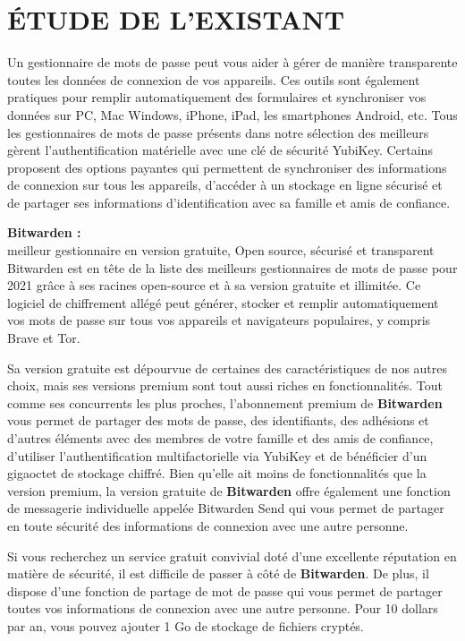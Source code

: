\documentclass[11pt,a4paper]{report}
\begin{document}
\chapter{ÉTUDE DE L'EXISTANT}

Un gestionnaire de mots de passe peut vous aider à gérer de manière transparente toutes les données de connexion de vos appareils. Ces outils sont également pratiques pour remplir automatiquement des formulaires et synchroniser vos données sur PC, Mac Windows, iPhone, iPad, les smartphones Android, etc. Tous les gestionnaires de mots de passe présents dans notre sélection des meilleurs gèrent l'authentification matérielle avec une clé de sécurité YubiKey. Certains proposent des options payantes qui permettent de synchroniser des informations de connexion sur tous les appareils, d'accéder à un stockage en ligne sécurisé et de partager ses informations d'identification avec sa famille et amis de confiance.

\textbf{Bitwarden :} \\
meilleur gestionnaire en version gratuite, Open source, sécurisé et transparent
Bitwarden est en tête de la liste des meilleurs gestionnaires de mots de passe pour 2021 grâce à ses racines open-source et à sa version gratuite et illimitée. Ce logiciel de chiffrement allégé peut générer, stocker et remplir automatiquement vos mots de passe sur tous vos appareils et navigateurs populaires, y compris Brave et Tor.

Sa version gratuite est dépourvue de certaines des caractéristiques de nos autres choix, mais ses versions premium sont tout aussi riches en fonctionnalités. Tout comme ses concurrents les plus proches, l'abonnement premium de \textbf{Bitwarden} vous permet de partager des mots de passe, des identifiants, des adhésions et d'autres éléments avec des membres de votre famille et des amis de confiance, d'utiliser l'authentification multifactorielle via YubiKey et de bénéficier d'un gigaoctet de stockage chiffré. Bien qu'elle ait moins de fonctionnalités que la version premium, la version gratuite de \textbf{Bitwarden} offre également une fonction de messagerie individuelle appelée Bitwarden Send qui vous permet de partager en toute sécurité des informations de connexion avec une autre personne.

Si vous recherchez un service gratuit convivial doté d'une excellente réputation en matière de sécurité, il est difficile de passer à côté de \textbf{Bitwarden}. De plus, il dispose d'une fonction de partage de mot de passe qui vous permet de partager toutes vos informations de connexion avec une autre personne. Pour 10 dollars par an, vous pouvez ajouter 1 Go de stockage de fichiers cryptés.
\end{document}
